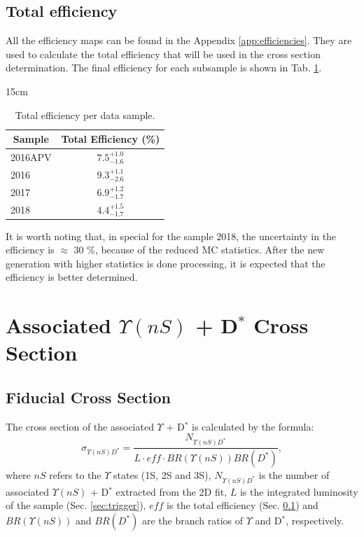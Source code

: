 \subsection{Total efficiency}\label{sec:total_eff}

All the efficiency maps can be found in the Appendix \ref{app:efficiencies}. They are used to calculate the total efficiency that will be used in the cross section determination. The final efficiency for each subsample is shown in Tab. \ref{tab:totaleff}.

\begin{table}[!htbp]{15cm}
  \caption{Total efficiency per data sample.}
  \begin{tabular}{ l | c }
    \hline
    \multicolumn{1}{c|}{Sample} & \multicolumn{1}{c}{Total Efficiency (\%)} \\ \hline
    2016APV                     & $7.5^{+1.0}_{-1.6}$                       \\ \hline
    2016                        & $9.3^{+1.1}_{-2.6}$                       \\ \hline
    2017                        & $6.9^{+1.2}_{-1.7}$                       \\ \hline
    2018                        & $4.4^{+1.5}_{-1.7}$                       \\ \hline
  \end{tabular}
  \label{tab:totaleff}
\end{table}

It is worth noting that, in special for the sample 2018, the uncertainty in the efficiency is $\approx$ 30 \%, because of the reduced MC statistics. After the new generation with higher statistics is done processing, it is expected that the efficiency is better determined.

\section{Associated \texorpdfstring{$\Upsilon(nS)$ + D$^{*}$}{Y+D*} Cross Section}

\subsection{Fiducial Cross Section} \label{subsec:fiducial_xsec}

The cross section of the associated $\Upsilon$ + D$^{*}$ is calculated by the formula:
\begin{equation}
  \sigma_{\Upsilon(nS) D^*} = \frac{N_{\Upsilon(nS) D^*}}{L\cdot eff \cdot BR(\Upsilon(nS))BR(D^*)},
\end{equation}
where $nS$ refers to the $\Upsilon$ states (1S, 2S and 3S), $N_{\Upsilon(nS) D^*}$ is the number of associated $\Upsilon(nS)$ + D$^*$ extracted from the 2D fit, $L$ is the integrated luminosity of the sample (Sec. \ref{sec:trigger}), $eff$ is the total efficiency (Sec. \ref{sec:total_eff}) and $BR(\Upsilon(nS))$ and $BR(D^*)$ are the branch ratios of $\Upsilon$ and D$^*$, respectively.

